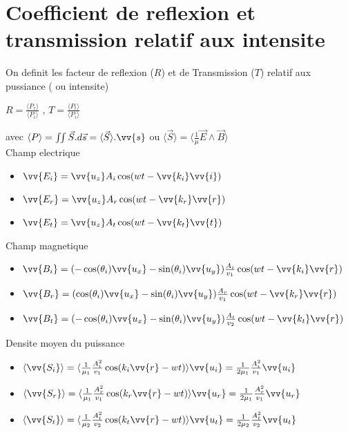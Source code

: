 \documentclass[12pt]{book}
\begin{document}
        \section{Coefficient de reflexion et transmission relatif aux intensite}
            On definit les facteur de reflexion ($R$) et de Transmission ($T$) relatif aux pussiance ( ou intensite) 
            \begin{center}
                $R = \frac{\langle P_r \rangle}{\langle P_i \rangle}$ , 
                $T = \frac{\langle P_t \rangle}{\langle P_i \rangle}$
            \end{center}
            avec $\langle P \rangle = \iint \vec{S}.d\vec{s} =\langle \vec{S} \rangle .\vv{s} $ ou $\langle \vec{S} \rangle = \langle \frac{1}{\mu}\vec{E}\wedge\vec{B} \rangle $ \\
            Champ electrique
            \begin{itemize}
                \item $\vv{E_i} = \vv{u_z}A_i\cos(wt-\vv{k_i}\vv{i})$
                \item $\vv{E_r} = \vv{u_z}A_r\cos(wt-\vv{k_r}\vv{r})$
                \item $\vv{E_t} = \vv{u_z}A_t\cos(wt-\vv{k_t}\vv{t})$
            \end{itemize}
            Champ magnetique
            \begin{itemize}
                \item $\vv{B_i} = (-\cos(\theta_i)\vv{u_x} - \sin(\theta_i)\vv{u_y})\frac{A_i}{v_1}\cos(wt - \vv{k_i}\vv{r})$
                \item $\vv{B_r} = (\cos(\theta_i)\vv{u_x} - \sin(\theta_i)\vv{u_y})\frac{A_r}{v_1}\cos(wt - \vv{k_r}\vv{r})$
                \item $\vv{B_t} = (-\cos(\theta_i)\vv{u_x} - \sin(\theta_i)\vv{u_y})\frac{A_t}{v_2}\cos(wt - \vv{k_t}\vv{r})$
            \end{itemize}
            Densite moyen du puissance
            \begin{itemize}
                \item $\langle \vv{S_i} \rangle = \langle \frac{1}{\mu_1}\frac{A_i^2}{v_1} \cos(k_i\vv{r} - wt) \rangle\vv{u_i} = \frac{1}{2\mu_1}\frac{A_i^2}{v_1}\vv{u_i} $
                \item $\langle \vv{S_r} \rangle = \langle \frac{1}{\mu_1}\frac{A_r^2}{v_1} \cos(k_r\vv{r} - wt) \rangle\vv{u_r} = \frac{1}{2\mu_1}\frac{A_r^2}{v_1}\vv{u_r} $
                \item $\langle \vv{S_t} \rangle = \langle \frac{1}{\mu_2}\frac{A_t^2}{v_2} \cos(k_t\vv{r} - wt) \rangle\vv{u_t} = \frac{1}{2\mu_2}\frac{A_t^2}{v_2}\vv{u_t} $
            \end{itemize}
\end{document}
